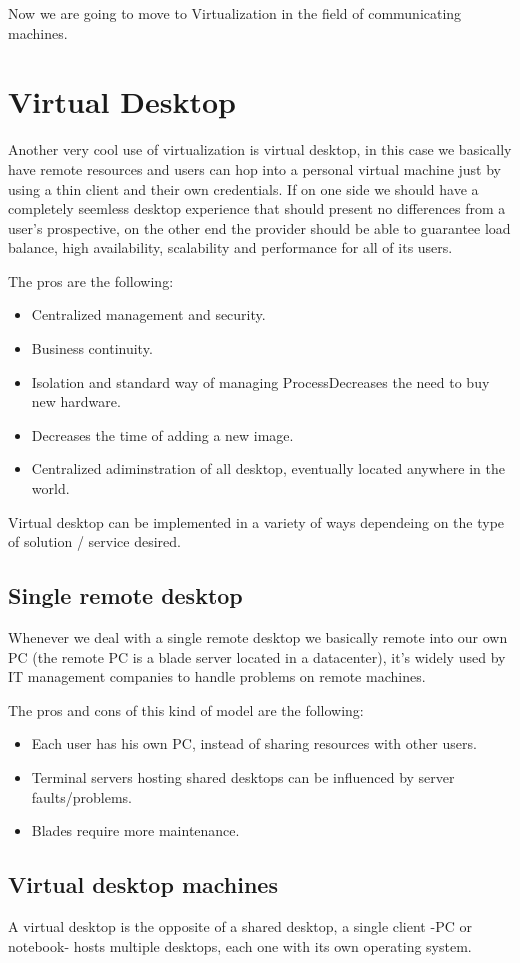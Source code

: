 Now we are going to move to Virtualization in the field of communicating machines.
\section{Virtual Desktop}
Another very cool use of virtualization is virtual desktop, in this case we basically have remote resources and users can hop into a personal virtual machine just by using a thin client and their own credentials. If on one side we should have a completely seemless desktop experience that should present no differences from a user's prospective, on the other end the provider should be able to guarantee load balance, high availability, scalability and performance for all of its users.

The pros are the following:
\begin{itemize}
    \item Centralized management and security.
    \item Business continuity.
    \item Isolation and standard way of managing ProcessDecreases the need to buy new hardware.
    \item Decreases the time of adding a new image.
    \item Centralized adiminstration of all desktop, eventually located anywhere in the world.
\end{itemize}
Virtual desktop can be implemented in a variety of ways dependeing on the type of solution / service desired.
\subsection{Single remote desktop}
Whenever we deal with a single remote desktop we basically remote into our own PC (the remote PC is a blade server located in a datacenter), it's widely used by IT management companies to handle problems on remote machines.

The pros and cons of this kind of model are the following:
\begin{itemize}
    \item Each user has his own PC, instead of sharing resources with other users.
    \item Terminal servers hosting shared desktops can be influenced by server faults/problems.
    \item Blades require more maintenance.
\end{itemize}
\subsection{Virtual desktop machines}
A virtual desktop is the opposite of a shared desktop, a single client -PC or notebook- hosts multiple desktops, each one with its own operating system.
